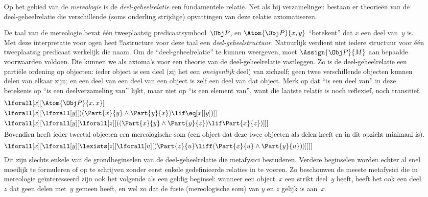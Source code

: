 \documentclass[openany]{memoir}
\begin{document}
\begin{ex}
Op het gebied van de \emph{mereologie} is de
\emph{deel-geheelrelatie} een fundamentele relatie. Net als bij
verzamelingen bestaan er theorieën van de deel-geheelrelatie die
verschillende (soms onderling strijdige) opvattingen van deze relatie
axiomatiseren.

De taal van de mereologie bevat één tweeplaatsig
predicaatsymbool~$\Obj P$, en $\Atom{\Obj P}{x, y}$ ``betekent'' dat
$x$ een deel van~$y$ is. Met deze interpretatie voor ogen heet
!!a{structure} voor deze taal een \emph{deel-geheelstructuur}.
Natuurlijk verdient niet iedere structuur voor één tweeplaatsig
predicaat werkelijk die naam. Om de ``deel-geheelrelatie'' te kunnen
weergeven, moet $\Assign{\Obj P}{M}$ aan bepaalde voorwaarden voldoen.
Die kunnen we als axioma's voor een theorie van de deel-geheelrelatie
vastleggen. Zo is de deel-geheelrelatie een partiële ordening op
objecten: ieder object is een deel (zij het een \emph{oneigenlijk}
deel) van zichzelf; geen twee verschillende objecten kunnen delen van
elkaar zijn; en een deel van een deel van een object is zelf een deel
van dat object. Merk op dat ``is een deel van'' in deze betekenis op
``is een deelverzameling van'' lijkt, maar niet op ``is een element
van'', want die laatste relatie is noch reflexief, noch transitief.
\begin{align*}
& \lforall[x][\Atom{\Obj P}{x,x}] \\
& \lforall[x][\lforall[y][((\Part{x}{y} \land \Part{y}{x})
      \lif \eq[x][y])]] \\
& \lforall[x][\lforall[y][\lforall[z][((\Part{x}{y} \land
        \Part{y}{z}) \lif \Part{x}{z})]]]\\
\intertext{Bovendien heeft ieder tweetal objecten een mereologische som (een object
  dat deze twee objecten als delen heeft en in dit opzicht minimaal is).}  &
\lforall[x][\lforall[y][\lexists[z][\lforall[u][(\Part{z}{u} \liff
        (\Part{x}{u} \land \Part{y}{u}))]]]]
\end{align*}
Dit zijn slechts enkele van de grondbeginselen van de
deel-geheelrelatie die metafysici bestuderen. Verdere beginselen worden
echter al snel moeilijk te formuleren of op te schrijven zonder eerst
enkele gedefinieerde relaties in te voeren. Zo beschouwen de meeste
metafysici die in mereologie geïnteresseerd zijn ook het volgende als
een geldig beginsel: wanneer een object~$x$ een strikt deel~$y$ heeft,
heeft het ook een deel~$z$ dat geen delen met~$y$ gemeen heeft, en wel
zo dat de fusie (mereologische som) van $y$ en $z$ gelijk is aan~$x$.
\end{ex}
\endgroup
\end{document}
